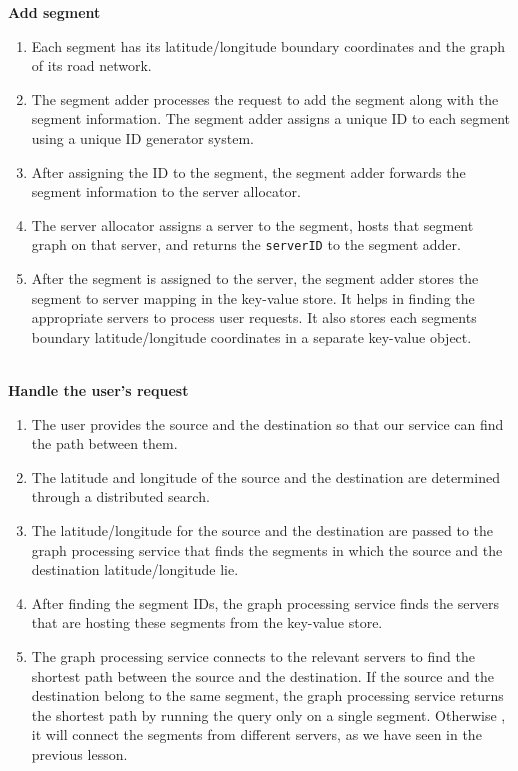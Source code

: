 \textbf{Add segment}

\begin{enumerate}
\item
\protect{}\label{D9PhzwmtZCagoXfrXNHMg}
Each segment has its latitude/longitude boundary coordinates and the graph of its road network.
\item
\protect{}\label{QeuMjxXmfHkLZVsKtGWB6}
The segment adder processes the request to add the segment along with the segment information. The segment adder assigns a unique ID to each segment using a unique ID generator system.
\item
\protect{}\label{ydruBZb6NI1MGT3rjchfP}
After assigning the ID to the segment, the segment adder forwards the segment information to the server allocator.
\item
\protect{}\label{Mw1p1F0TB5dMfR3My6Wil}
The server allocator assigns a server to the segment, hosts that segment graph on that server, and returns the \texttt{serverID} to the segment adder.
\item
\protect{}\label{fCql-34t_8GRiAN-R8XuX}
After the segment is assigned to the server, the segment adder stores the segment to server mapping in the key-value store. It helps in finding the appropriate servers to process user requests. It also stores each segment\textquotesingle s boundary latitude/longitude coordinates in a separate key-value object.
\end{enumerate}
\\
\textbf{Handle the user's request}

\begin{enumerate}
\item
\protect{}\label{aw_Grfc8lvVzg7Id4F6-k}
The user provides the source and the destination so that our service can find the path between them.
\item
\protect{}\label{Fx-feCJRD6DPLlQigmJeY}
The latitude and longitude of the source and the destination are determined through a distributed search.
\item
\protect{}\label{zYqanpNp0MEojLMBKTddV}
The latitude/longitude for the source and the destination are passed to the graph processing service that finds the segments in which the source and the destination latitude/longitude lie.
\item
\protect{}\label{0Rajun2_fmarCtklNJj_n}
After finding the segment IDs, the graph processing service finds the servers that are hosting these segments from the key-value store.
\item
\protect{}\label{twN6aEYqkiN9tuxGEeJn8}
The graph processing service connects to the relevant servers to find the shortest path between the source and the destination. If the source and the destination belong to the same segment, the graph processing service returns the shortest path by running the query only on a single segment. Otherwise , it will connect the segments from different servers, as we have seen in the previous lesson.
\end{enumerate}

